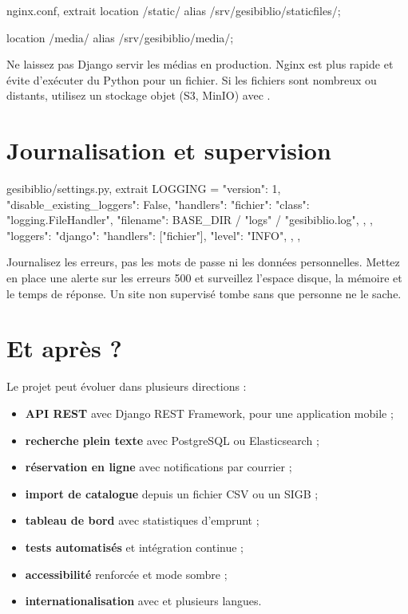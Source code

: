 \begin{codebox}[bash]{nginx.conf, extrait}
location /static/ {
    alias /srv/gesibiblio/staticfiles/;
}

location /media/ {
    alias /srv/gesibiblio/media/;
}
\end{codebox}

\begin{attention}
Ne laissez pas Django servir les médias en production. Nginx est plus rapide et
évite d'exécuter du Python pour un fichier. Si les fichiers sont nombreux ou
distants, utilisez un stockage objet (S3, MinIO) avec .
\end{attention}

\section{Journalisation et supervision}

\begin{codebox}[python]{gesibiblio/settings.py, extrait}
LOGGING = {
    "version": 1,
    "disable_existing_loggers": False,
    "handlers": {
        "fichier": {
            "class": "logging.FileHandler",
            "filename": BASE_DIR / "logs" / "gesibiblio.log",
        },
    },
    "loggers": {
        "django": {
            "handlers": ["fichier"],
            "level": "INFO",
        },
    },
}
\end{codebox}

\begin{bonne}
Journalisez les erreurs, pas les mots de passe ni les données personnelles. Mettez
en place une alerte sur les erreurs 500 et surveillez l'espace disque, la mémoire
et le temps de réponse. Un site non supervisé tombe sans que personne ne le
sache.
\end{bonne}

\section{Et après ?}

Le projet \gesibiblio{} peut évoluer dans plusieurs directions :

\begin{itemize}
  \item \textbf{API REST} avec Django REST Framework, pour une application mobile ;
  \item \textbf{recherche plein texte} avec PostgreSQL ou Elasticsearch ;
  \item \textbf{réservation en ligne} avec notifications par courrier ;
  \item \textbf{import de catalogue} depuis un fichier CSV ou un SIGB ;
  \item \textbf{tableau de bord} avec statistiques d'emprunt ;
  \item \textbf{tests automatisés} et intégration continue ;
  \item \textbf{accessibilité} renforcée et mode sombre ;
  \item \textbf{internationalisation} avec  et plusieurs langues.
\end{itemize}

